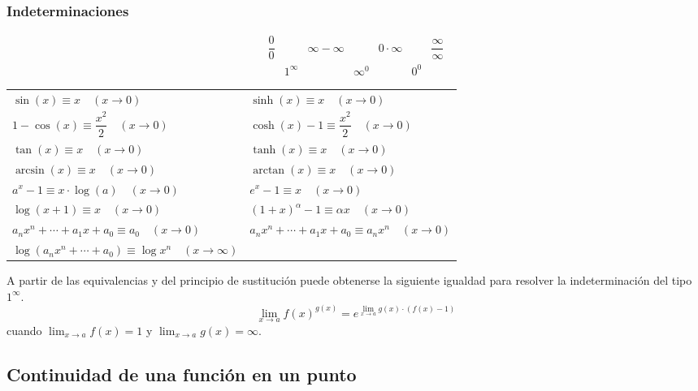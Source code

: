 \subsubsection{Indeterminaciones}

\[ 	\begin{array}{ccccccc}
		\dfrac{0}{0} &  & \infty-\infty &  & 0\cdot\infty &  & \dfrac{\infty}{\infty} \\
		& 1^\infty &  & \infty^0 &  & 0^0 & 
	\end{array} \]

\begin{center}
	\begin{tabular}{|ll|}
	\hline
	\rowcolor{blue!40}\multicolumn{2}{|c|}{Tabla de equivalencias} \\ \hline

	$\sin(x)\equiv x\quad(x\to0)$&  $\sinh(x)\equiv x\quad(x\to0)$\\

	$1-\cos(x)\equiv\dfrac{x^2}{2}\quad(x\to0)$ &  $\cosh(x)-1\equiv\dfrac{x^2}{2}\quad(x\to0)$\\

	$\tan(x)\equiv x\quad(x\to0)$&  $\tanh(x)\equiv x\quad(x\to0)$\\

	$\arcsin(x)\equiv x\quad(x\to0)$&  $\arctan(x)\equiv x\quad(x\to0)$\\

	$a^x-1\equiv x\cdot\log(a)\quad(x\to0)$&  $e^x-1\equiv x\quad(x\to0)$\\

	$\log(x+1)\equiv x\quad(x\to0)$&  $(1+x)^\alpha-1\equiv\alpha x\quad(x\to0)$\\

	$a_nx^n+\cdots+a_1x+a_0\equiv a_0\quad(x\to0)$&  $a_nx^n+\cdots+a_1x+a_0\equiv a_nx^n\quad(x\to0)$\\

	$\log(a_nx^n+\cdots+a_0)\equiv\log x^n\quad(x\to\infty)$&  \\
	\hline
\end{tabular}
\end{center}
A partir de las equivalencias y del principio de sustitución puede obtenerse la siguiente igualdad para resolver la indeterminación del tipo $1^\infty$. \[ \lim_{x\to a}f(x)^{g(x)} =e^{\lim_{x\to a}g(x)\cdot(f(x)-1)}\] cuando $\lim_{x\to a}f(x)=1$ y $\lim_{x\to a}g(x)=\infty$.
\subsection{Continuidad de una función en un punto}
